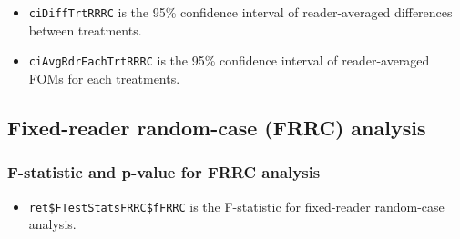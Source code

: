 \documentclass[]{book}
\newenvironment{Shaded}{\begin{snugshade}}{\end{snugshade}}
\newcommand{\CommentTok}[1]{\textcolor[rgb]{0.56,0.35,0.01}{\textit{#1}}}
\newcommand{\NormalTok}[1]{#1}
\newcommand{\OperatorTok}[1]{\textcolor[rgb]{0.81,0.36,0.00}{\textbf{#1}}}
\providecommand{\tightlist}{%
  \setlength{\itemsep}{0pt}\setlength{\parskip}{0pt}}
\begin{document}
\begin{itemize}
\tightlist
\item
  \texttt{ciDiffTrtRRRC} is the 95\% confidence interval of reader-averaged differences between treatments.
\end{itemize}

\begin{Shaded}
\end{Shaded}

\begin{itemize}
\tightlist
\item
  \texttt{ciAvgRdrEachTrtRRRC} is the 95\% confidence interval of reader-averaged FOMs for each treatments.
\end{itemize}

\begin{Shaded}
\end{Shaded}

\hypertarget{fixed-reader-random-case-frrc-analysis}{%
\subsection{Fixed-reader random-case (FRRC) analysis}\label{fixed-reader-random-case-frrc-analysis}}

\hypertarget{f-statistic-and-p-value-for-frrc-analysis}{%
\subsubsection{F-statistic and p-value for FRRC analysis}\label{f-statistic-and-p-value-for-frrc-analysis}}

\begin{itemize}
\tightlist
\item
  \texttt{ret\$FTestStatsFRRC\$fFRRC} is the F-statistic for fixed-reader random-case analysis.
\end{itemize}
\end{document}
